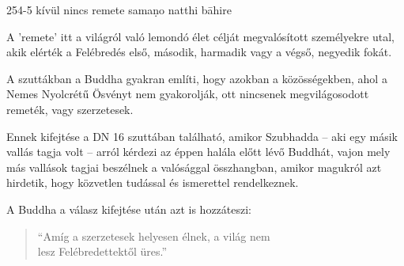 
\begin{notesdescription}

\item[{254-5}
{kívül nincs remete}
{samaṇo natthi bāhire}] \hfill\par

A 'remete' itt a világról való lemondó élet célját megvalósított személyekre utal, akik elérték a Felébredés első, második, harmadik vagy a végső, negyedik fokát.

A szuttákban a Buddha gyakran említi, hogy azokban a közösségekben, ahol a Nemes Nyolcrétű Ösvényt nem gyakorolják, ott nincsenek megvilágosodott remeték, vagy szerzetesek.

Ennek kifejtése a DN 16 szuttában található, amikor Szubhadda -- aki egy másik vallás tagja volt -- arról kérdezi az éppen halála előtt lévő Buddhát, vajon mely más vallások tagjai beszélnek a valósággal összhangban, amikor magukról azt hirdetik, hogy közvetlen tudással és ismerettel rendelkeznek.

A Buddha a válasz kifejtése után azt is hozzáteszi:

\begin{quote}
``Amíg a szerzetesek helyesen élnek, a világ nem\\ lesz Felébredettektől üres.''
\end{quote}

\end{notesdescription}
